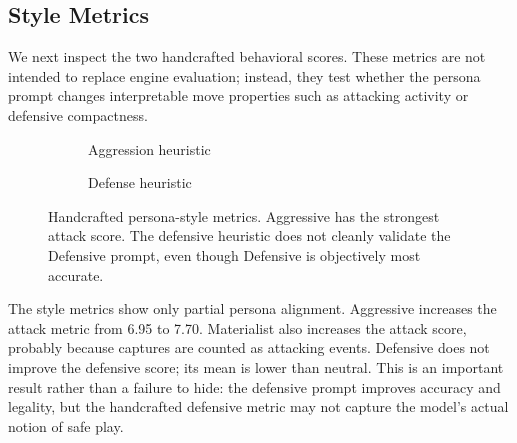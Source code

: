 \documentclass[10pt]{article}
\begin{document}
\FloatBarrier

\subsection{Style Metrics}

We next inspect the two handcrafted behavioral scores. These metrics are not intended to replace engine evaluation; instead, they test whether the persona prompt changes interpretable move properties such as attacking activity or defensive compactness.

\begin{figure}[!htbp]
\centering
\begin{subfigure}{0.48\linewidth}
\centering
{}
\caption{Aggression heuristic}
\end{subfigure}
\hfill
\begin{subfigure}{0.48\linewidth}
\centering
{}
\caption{Defense heuristic}
\end{subfigure}
\caption{Handcrafted persona-style metrics. Aggressive has the strongest attack score. The defensive heuristic does not cleanly validate the Defensive prompt, even though Defensive is objectively most accurate.}
\label{fig:style-metrics}
\end{figure}

The style metrics show only partial persona alignment. Aggressive increases the attack metric from 6.95 to 7.70. Materialist also increases the attack score, probably because captures are counted as attacking events. Defensive does not improve the defensive score; its mean is lower than neutral. This is an important result rather than a failure to hide: the defensive prompt improves accuracy and legality, but the handcrafted defensive metric may not capture the model's actual notion of safe play.
\end{document}
